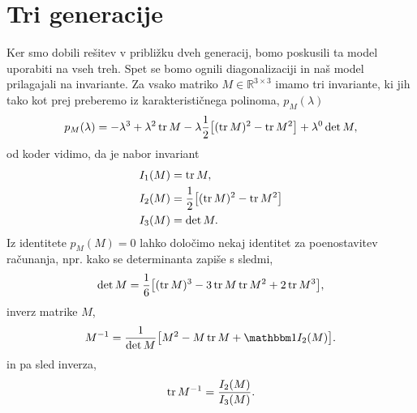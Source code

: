 \chapter{Tri generacije}

Ker smo dobili rešitev v približku dveh generacij, bomo poskusili ta model uporabiti na vseh treh.
Spet se bomo ognili diagonalizaciji in naš model prilagajali na invariante. Za vsako matriko
$M \in \mathbb{R}^{3\times 3}$ imamo tri invariante, ki jih tako kot prej preberemo iz
karakterističnega polinoma, $p_M(\lambda)$
\begin{equation}
	p_M(\lambda) = -\lambda^3 + \lambda^2\operatorname{tr} M - \lambda \frac{1}{2}\big[(\operatorname{tr} M)^2
	- \operatorname{tr} M^2\big] + \lambda^0\det M,
	\label{char3}
\end{equation}
od koder vidimo, da je nabor invariant
\begin{align}
	I_1 (M) &= \operatorname{tr} M, \notag \\
	I_2 (M) &= \frac{1}{2}\big[(\operatorname{tr} M)^2 - \operatorname{tr} M^2\big] \notag \\
	I_3 (M) &= \det M.
\end{align}
Iz identitete $p_M(M) = 0$ lahko določimo nekaj identitet za poenostavitev računanja, npr.
kako se determinanta zapiše s sledmi,
\begin{equation}
	\det M = \frac{1}{6}\big[(\operatorname{tr} M)^3 - 3\operatorname{tr} M\operatorname{tr} M^2 + 2\operatorname{tr} M^3\big],
\end{equation}
inverz matrike $M$,
\begin{equation}
	M^{-1} = \frac{1}{\det M}\big[M^2 - M\tr M + \one I_2(M)\big].
\end{equation}
in pa sled inverza,
\begin{equation}
	\operatorname{tr} M^{-1} = \frac{I_2(M)}{I_3(M)}.
\end{equation}

